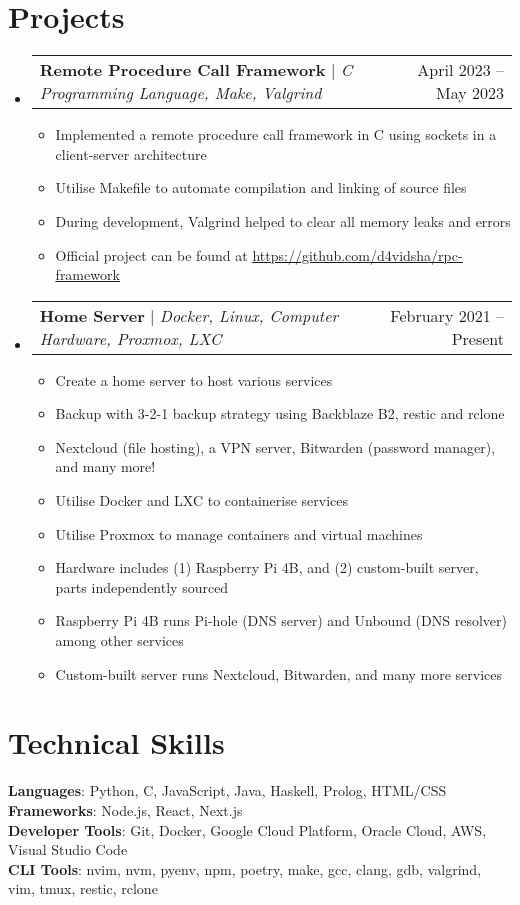 \documentclass[letterpaper,11pt]{article}
\makeatletter
\newcommand{\resumeItem}[1]{
  \item\small{
    {#1 \vspace{-2pt}}
  }
}
\newcommand{\resumeProjectHeading}[2]{
    \item
    \begin{tabular*}{0.97\textwidth}{l@{\extracolsep{\fill}}r}
      \small#1 & #2 \\
    \end{tabular*}\vspace{-7pt}
}
\newcommand{\resumeSubHeadingListStart}{\begin{itemize}[leftmargin=0.15in, label={}]}
\newcommand{\resumeSubHeadingListEnd}{\end{itemize}}
\newcommand{\resumeItemListStart}{\begin{itemize}}
\newcommand{\resumeItemListEnd}{\end{itemize}\vspace{-5pt}}
\makeatother
\begin{document}
\section{Projects}
    \resumeSubHeadingListStart
      \resumeProjectHeading
        {\textbf{Remote Procedure Call Framework} $|$ \emph{C Programming Language, Make, Valgrind}}{April 2023 -- May 2023}
        \resumeItemListStart
          \resumeItem{Implemented a remote procedure call framework in C using sockets in a client-server architecture}
          \resumeItem{Utilise Makefile to automate compilation and linking of source files}
          \resumeItem{During development, Valgrind helped to clear all memory leaks and errors}
          \resumeItem{Official project can be found at \href{https://github.com/d4vidsha/rpc-framework}{\underline{https://github.com/d4vidsha/rpc-framework}}}
        \resumeItemListEnd
      \resumeProjectHeading
        {\textbf{Home Server} $|$ \emph{Docker, Linux, Computer Hardware, Proxmox, LXC}}{February 2021 -- Present}
          \resumeItemListStart
            \resumeItem{Create a home server to host various services}
            \resumeItem{Backup with 3-2-1 backup strategy using Backblaze B2, restic and rclone}
            \resumeItem{Nextcloud (file hosting), a VPN server, Bitwarden (password manager), and many more!}
            \resumeItem{Utilise Docker and LXC to containerise services}
            \resumeItem{Utilise Proxmox to manage containers and virtual machines}
            \resumeItem{Hardware includes (1) Raspberry Pi 4B, and (2) custom-built server, parts independently sourced}
            \resumeItem{Raspberry Pi 4B runs Pi-hole (DNS server) and Unbound (DNS resolver) among other services}
            \resumeItem{Custom-built server runs Nextcloud, Bitwarden, and many more services}
          \resumeItemListEnd
    \resumeSubHeadingListEnd



%
\section{Technical Skills}
 \begin{itemize}[leftmargin=0.15in, label={}]
    \small{\item{
     \textbf{Languages}{: Python, C, JavaScript, Java, Haskell, Prolog, HTML/CSS} \\
     \textbf{Frameworks}{: Node.js, React, Next.js} \\
     \textbf{Developer Tools}{: Git, Docker, Google Cloud Platform, Oracle Cloud, AWS, Visual Studio Code} \\
     \textbf{CLI Tools}{: nvim, nvm, pyenv, npm, poetry, make, gcc, clang, gdb, valgrind, vim, tmux, restic, rclone}
    }}
 \end{itemize}


\end{document}
